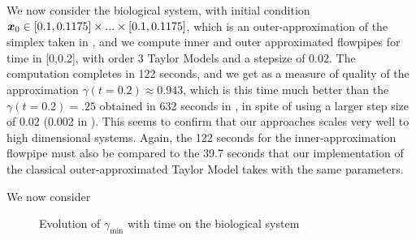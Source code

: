 





We now consider the biological system, with initial condition $\x_0 \in [0.1,0.1175] \times...\times [0.1,0.1175]$, which is an outer-approximation
of the simplex taken in  \cite{Underapproxflowpipes}, and we compute inner and outer approximated flowpipes for time in [0,0.2], 
with order 3 Taylor Models and a stepsize of 0.02. The computation completes in 122 seconds, and we get as a measure of quality of the approximation 
$\gamma(t=0.2) \approx 0.943$, which is this time much better than the $\gamma(t=0.2) = .25$ obtained in 632 seconds in  \cite{Underapproxflowpipes}, in spite of using a larger step size of 0.02 (0.002 in \cite{Underapproxflowpipes}). This seems to confirm that our approaches scales very well to high dimensional systems. 
Again, the 122 seconds for the inner-approximation flowpipe must also be compared to the 39.7 seconds that our implementation of the classical 
outer-approximated Taylor Model takes with the same parameters.


We now consider
 
\begin{figure}
\begin{center}
\end{center}
\caption{Evolution of $\gamma_{\min}$ with time on the biological system}
\label{ex:width_sriram_bio}
\end{figure}

